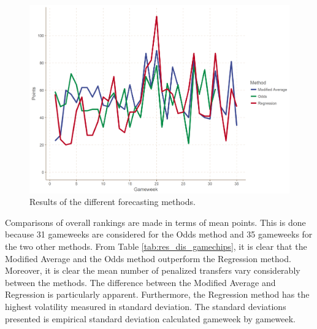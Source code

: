 \newpar

\begin{figure}[!htbp]
    \centering
    \includegraphics[scale=0.45]{fig/chapter_7/comparison_methods.png}
    \caption{Results of the different forecasting methods.}
\label{fig:res_comp_dis_gamechips}    
\end{figure}

Comparisons of overall rankings are made in terms of mean points. This is done because 31 gameweeks are considered for the Odds method and 35 gameweeks for the two other methods. From Table \ref{tab:res_dis_gamechips}, it is clear that the Modified Average and the Odds method outperform the Regression method. Moreover, it is clear the mean number of penalized transfers vary considerably between the methods. The difference between the Modified Average and Regression is particularly apparent. Furthermore, the Regression method has the highest volatility measured in standard deviation. The standard deviations presented is empirical standard deviation calculated gameweek by gameweek.
\newpar

\begin{table}[H]
\centering
{}
\caption{Results disregarding gamechips.}
\label{tab:res_dis_gamechips}
\end{table}


